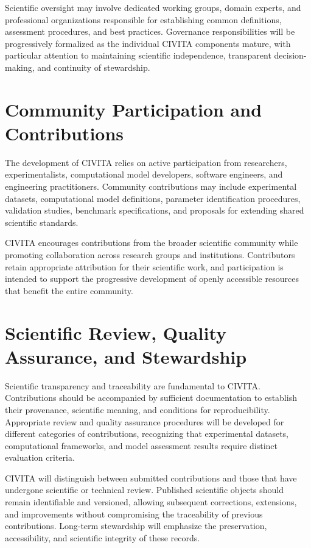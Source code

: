Scientific oversight may involve dedicated working groups, domain experts, and professional organizations responsible for establishing common definitions, assessment procedures, and best practices. Governance responsibilities will be progressively formalized as the individual CIVITA components mature, with particular attention to maintaining scientific independence, transparent decision-making, and continuity of stewardship.

\section{Community Participation and Contributions}

The development of CIVITA relies on active participation from researchers, experimentalists, computational model developers, software engineers, and engineering practitioners. Community contributions may include experimental datasets, computational model definitions, parameter identification procedures, validation studies, benchmark specifications, and proposals for extending shared scientific standards.

CIVITA encourages contributions from the broader scientific community while promoting collaboration across research groups and institutions. Contributors retain appropriate attribution for their scientific work, and participation is intended to support the progressive development of openly accessible resources that benefit the entire community.

\section{Scientific Review, Quality Assurance, and Stewardship}

Scientific transparency and traceability are fundamental to CIVITA. Contributions should be accompanied by sufficient documentation to establish their provenance, scientific meaning, and conditions for reproducibility. Appropriate review and quality assurance procedures will be developed for different categories of contributions, recognizing that experimental datasets, computational frameworks, and model assessment results require distinct evaluation criteria.

CIVITA will distinguish between submitted contributions and those that have undergone scientific or technical review. Published scientific objects should remain identifiable and versioned, allowing subsequent corrections, extensions, and improvements without compromising the traceability of previous contributions. Long-term stewardship will emphasize the preservation, accessibility, and scientific integrity of these records.

